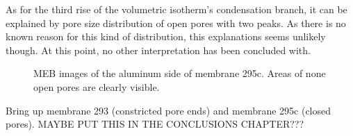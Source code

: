 \documentclass[../thesis.tex]{subfiles}
\begin{document}
        As for the third rise of the volumetric isotherm's condensation branch, it can be explained by pore size distribution of open pores with two peaks. As there is no known reason for this kind of distribution, this explanations seems unlikely though. At this point, no other interpretation has been concluded with. 



        \begin{figure}[htpb]
          \hfill
          \caption{MEB images of the aluminum side of membrane 295c. Areas of none open pores are clearly visible.}
          \label{fig:295c-meb}
        \end{figure}

      \medskip

      Bring up membrane 293 (constricted pore ends) and membrane 295c (closed pores).
      MAYBE PUT THIS IN THE CONCLUSIONS CHAPTER???
\end{document}
